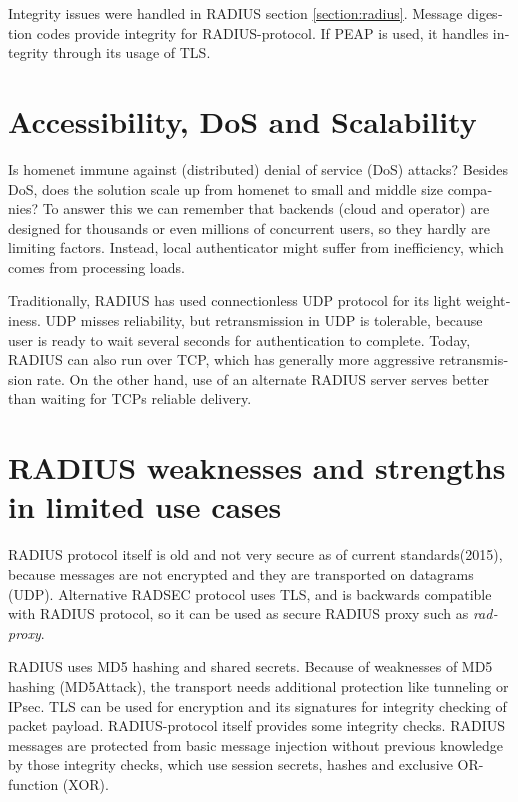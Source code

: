 \documentclass[12pt,a4paper,english]{tutthesis}
\begin{document}
\begin{otherlanguage}{english}
Integrity issues were handled in RADIUS section \ref{section:radius}.
Message digestion codes provide integrity for RADIUS-protocol.
If PEAP is used, it handles integrity through its usage of TLS\cite{peap}.

\section{Accessibility, DoS and Scalability}
\label{sec-6-6}
Is homenet immune against (distributed) denial of service (DoS)
attacks? Besides DoS, does the solution scale up from homenet to
small and middle size companies?
To answer this we can remember that backends (cloud and operator) are
designed for thousands or even millions of concurrent users, so 
they hardly are limiting factors. Instead, local
authenticator might suffer from inefficiency, which
comes from processing loads\cite{2009-lin-simefficiency}.


Traditionally, RADIUS has used connection\-less UDP protocol for its
light weightiness. UDP misses reliability, but retransmission in UDP is
tolerable, because user is ready to wait several seconds for
authentication to complete. Today, RADIUS can also run over TCP, which
has generally more aggressive retransmission
rate\cite[section 2.2.1]{rfc5080}. On the other hand, use of an alternate
RADIUS server serves better than waiting for TCPs reliable delivery.



\section{RADIUS weaknesses and strengths in limited use cases}
\label{sec-6-7}


RADIUS protocol itself is old and not very secure as of current
standards(2015), because messages are not encrypted and they are
transported on datagrams (UDP). Alternative RADSEC protocol uses TLS, and 
is backwards compatible with RADIUS protocol, so it can be used
as secure RADIUS proxy such as \emph{radproxy}\cite{uninett-radproxy}.

RADIUS uses MD5 hashing and shared secrets. Because of weaknesses of
MD5 hashing (MD5Attack\cite{rfc5176}), the transport needs additional
protection like tunneling or IPsec. TLS can be used for encryption and
its signatures for integrity checking of packet payload.
RADIUS-protocol itself provides some integrity checks.
RADIUS messages are protected from basic message injection without
previous knowledge by those integrity checks, which use session
secrets, hashes and exclusive OR-function (XOR).



\end{otherlanguage}
\end{document}
